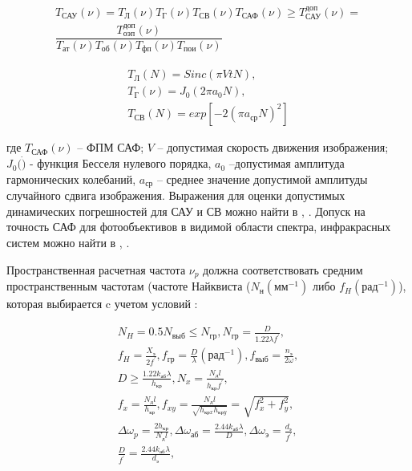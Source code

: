 \begin{equation}
\label{eq:p2:6}
\begin{alignedat}{2}
T_{\textit{САУ}}\left(\nu\right)=
T_\textit{Л}\left(\nu\right)T_\textit{Г}\left(\nu\right)T_{\textit{СВ}}\left(\nu\right)T_{\textit{САФ}}\left(\nu\right)\geq{}T_{\textit{САУ}}^{\textit{доп}}(\nu)= \\
\dfrac{ T_{\textit{оэп}}^{\textit{доп}}(\nu) }{ T_{\textit{ат}}(\nu)T_{\textit{об}}(\nu)T_{\textit{фп}}(\nu)T_{\textit{пои}}(\nu) }
\end{alignedat}
\end{equation}

\begin{equation}
\label{eq:p2:7}
\begin{alignedat}{3}
T_\textit{Л}\left(N\right)=Sinc(\pi{}VtN) , \\
T_{\textit{Г}}(\nu)=J_0\left(2\pi{}a_0N\right) , \\
T_{\textit{СВ}}\left(N\right) = exp[-2{(\pi{}a_{\textit{ср}}N)}^2]
\end{alignedat}
\end{equation}

где $T_{\textit{САФ}}(\nu)$ – ФПМ САФ; 
$V$ – допустимая скорость движения изображения; 
$J_0(\dot)$ - функция Бесселя нулевого порядка, 
$a_0$ –допустимая амплитуда гармонических колебаний, 
$a_{\textit{ср}}$ – среднее значение допустимой амплитуды случайного сдвига изображения. 
Выражения для оценки допустимых динамических погрешностей для САУ и СВ можно найти в \cite[]{Karpov}, \cite[]{Karpov23}. Допуск на точность САФ для фотообъективов в видимой области спектра, инфракрасных систем можно найти в \cite[]{Tarasov}, \cite[]{Belyakov}.

Пространственная расчетная частота $\nu_p$ должна соответствовать средним пространственным частотам (частоте Найквиста ($N_{\textit{н}} (\textit{мм}^{-1})$ либо $f_H (\textit{рад}^{-1})$), которая выбирается c учетом условий \cite[]{Tarasov}: 

\begin{equation}
\label{eq:p2:8}
\begin{alignedat}{2}
N_H=0.5 N_{\textit{выб}}\leq{}N_{\textit{гр}},
N_{\textit{гр}}=\frac{D}{1.22\lambda{}f^{'}},\\
f_H=\frac{X_\textit{э}}{2f^{'}},
f_{\textit{гр}}=\frac{D}{\lambda{}}(\textit{рад}^{-1}),
f_{\textit{выб}}=\frac{n_{\textit{э}}}{2\omega{}},\\
D\geq{}\frac{1.22 k_{\textit{аб}}\lambda{}}{h_{\textit{кр}}},
N_x=\frac{N_{\textit{д}}l}{h_{\textit{кр}}f^{'}},\\
f_x=\frac{N_{\textit{д}}l}{h_{\textit{кр}}},
f_{xy}=\frac{N_{\textit{д}}l}{\sqrt{h_{\textit{крx}}h_{\textit{крy}}}}=\sqrt{f_x^2+f_y^2},\\
\Delta{}{\omega{}}_p=\frac{2h_{\textit{кр}}}{N_{\textit{д}}l},
\Delta{}{\omega{}}_{\textit{аб}} =\frac{2.44 k_{\textit{аб}}\lambda{}}{D},
\Delta{}{\omega{}}_{\textit{э}} =\frac{d_{\textit{э}}}{f^{'}},\\
\frac{D}{f^{'}}=\frac{2.44 k_{\textit{аб}}\lambda{}}{d_{\textit{э}}},\\
\end{alignedat}
\end{equation}

